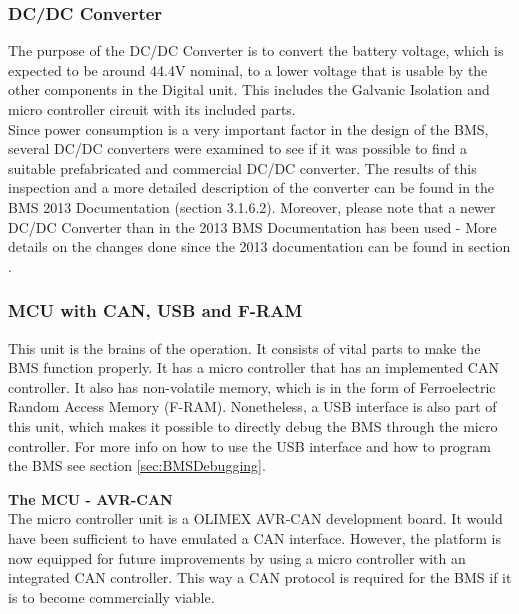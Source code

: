 \subsubsection{DC/DC Converter}
The purpose of the DC/DC Converter is to convert the battery voltage, which is expected to be around 44.4V nominal, to a lower voltage that is usable by the other components in the Digital unit. This includes the Galvanic Isolation and micro controller circuit with its included parts. \\
Since power consumption is a very important factor in the design of the BMS, several DC/DC converters were examined to see if it was possible to find a suitable prefabricated and commercial DC/DC converter. The results of this inspection and a more detailed description of the converter can be found in the BMS 2013 Documentation \cite{BMSDocumentation} (section 3.1.6.2). Moreover, please note that a newer DC/DC Converter than in the 2013 BMS Documentation has been used - More details on the changes done since the 2013 documentation can be found in section .  

\subsubsection{MCU with CAN, USB and F-RAM}
This unit is the brains of the operation. It consists of vital parts to make the BMS function properly. It has a micro controller that has an implemented CAN controller. It also has non-volatile memory, which is in the form of Ferroelectric Random Access Memory (F-RAM). Nonetheless, a USB interface is also part of this unit, which makes it possible to directly debug the BMS through the micro controller. For more info on how to use the USB interface and how to program the BMS see section \vref{sec:BMSDebugging}.

\textbf{The MCU - AVR-CAN}\\
The micro controller unit is a OLIMEX AVR-CAN development board. It would have been sufficient to have emulated a CAN interface. However, the platform is now equipped for future improvements by using a micro controller with an integrated CAN controller. This way a CAN protocol is required for the BMS if it is to become commercially viable.

